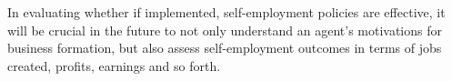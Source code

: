 In evaluating whether if implemented, self-employment policies are effective, it will be crucial in the future to not only understand an agent's motivations for business formation, but also assess self-employment outcomes in terms of jobs created, profits, earnings and so forth. 














